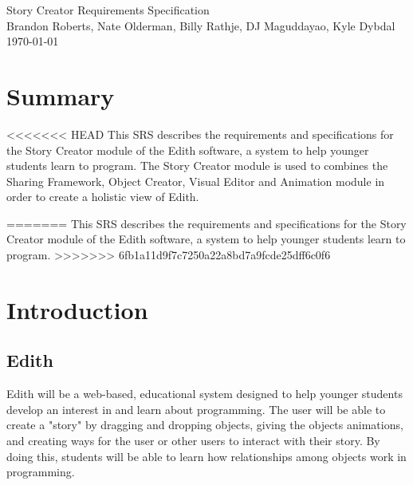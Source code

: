 \documentclass[12pt]{article}
\begin{document}

\begin{titlepage}
	\vspace*{\fill} %
	\begin{center}
		{\Huge Story Creator Requirements Specification}\\ [0.5cm]	%
		{\Large Brandon Roberts, Nate Olderman, Billy Rathje, DJ Maguddayao, Kyle Dybdal}\\[0.4cm]
		\today %
	\end{center}
	\vspace*{\fill}
\end{titlepage}

\section{Summary}
<<<<<<< HEAD
This SRS describes the requirements and specifications for the Story Creator module of the Edith software, a system to help younger students learn to program. The Story Creator module is used to combines the Sharing Framework, Object Creator, Visual Editor and Animation module in order to create a holistic view of Edith.  

=======
This SRS describes the requirements and specifications for the Story Creator module of the Edith software, a system to help younger students learn to program.
>>>>>>> 6fb1a11d9f7c7250a22a8bd7a9fcde25dff6c0f6


\section{Introduction}%
	\subsection{Edith}
	Edith will be a web-based, educational system designed to help younger students develop an interest in and learn about programming. The user will be able to create a "story" by dragging and dropping objects, giving the objects animations, and creating ways for the user or other users to interact with their story. By doing this, students will be able to learn how relationships among objects work in programming.
\end{document}
